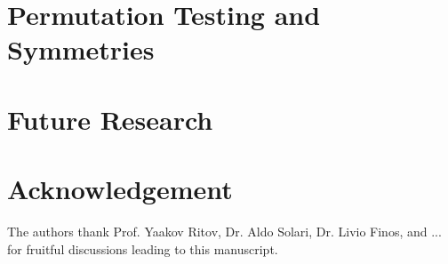 \documentclass[article,lineno]{biometrika}
\begin{document}
\section{Permutation Testing and Symmetries}



\section{Future Research}




\section*{Acknowledgement}
The authors thank Prof. Yaakov Ritov, Dr. Aldo Solari, Dr. Livio Finos, and ... for fruitful discussions leading to this manuscript. 






\end{document}
